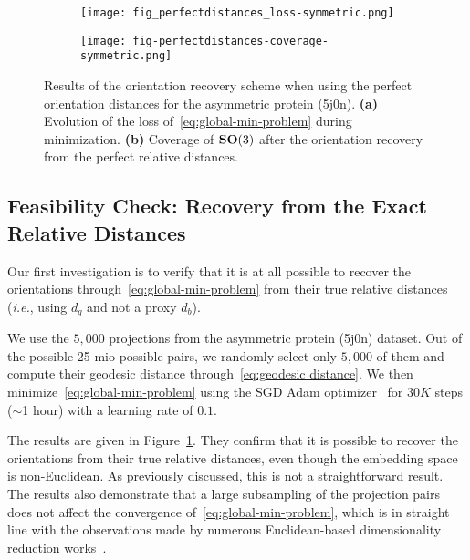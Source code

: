 \begin{figure}[t]
    \centering
    \begin{subfigure}[b]{0.48\textwidth}
        \texttt{[image: fig\_perfectdistances\_loss-symmetric.png]}
        \caption{}
    \end{subfigure} \quad
    \begin{subfigure}[b]{0.48\textwidth}
    \centering
        \texttt{[image: fig-perfectdistances-coverage-symmetric.png]}
        \caption{}
    \end{subfigure}
    \caption{Results of the orientation recovery scheme when using the perfect orientation distances for the asymmetric protein (5j0n). \textbf{(a)} Evolution of the loss of~\eqref{eq:global-min-problem} during minimization. \textbf{(b)} Coverage of $\mathrm{\mathbf{SO}}(3)$ after the orientation recovery from the perfect relative distances. }
    \label{fig:minim-loss-perfect-distances}
\end{figure}

\subsection{Feasibility Check: Recovery from the Exact Relative Distances}
\label{subsec:5-6-3-sanity-check}

Our first investigation is to verify that it is at all possible to recover the orientations through~\eqref{eq:global-min-problem} from their true relative distances (\textit{i.e.}, using $d_q$ and not a proxy $d_b$).

We use the $5,000$ projections from the asymmetric protein (5j0n) dataset. Out of the possible 25 mio possible pairs, we randomly select only $5,000$ of them and compute their geodesic distance through~\eqref{eq:geodesic distance}. We then minimize~\eqref{eq:global-min-problem} using the SGD Adam optimizer~\cite{kingma2014adam} for $30K$ steps ($\sim$1 hour) with a learning rate of $0.1$.

The results are given in Figure~\ref{fig:minim-loss-perfect-distances}. They confirm that it is possible to recover the orientations from their true relative distances, even though the embedding space is non-Euclidean. As previously discussed, this is not a straightforward result. The results also demonstrate that a large subsampling of the projection pairs does not affect the convergence of~\eqref{eq:global-min-problem}, which is in straight line with the observations made by numerous Euclidean-based dimensionality reduction works~\cite{belkin2003laplacian,kruskal1978multidimensional, maaten2008visualizing, mcinnes2018umap}.

